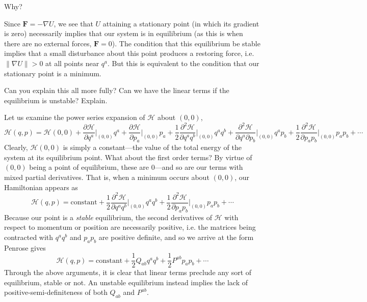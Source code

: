 \documentclass[../road-to-reality.tex]{subfiles}
\begin{document}
\begin{questions}
\question Why?

  \begin{solution}
    Since $\mathbf{F}=-\nabla{U}$, we see that $U$ attaining a stationary point (in which its
    gradient is zero) necessarily implies that our system is in 
    equilibrium (as this is when there are no external forces, $\mathbf{F} =
    0$). The condition that this equilibrium be stable implies that a small disturbance about this point produces a restoring force, i.e. $\|\nabla{U}\|
    > 0$ at all points near $q^a$. But this is equivalent to the condition that our stationary point is a minimum.
  \end{solution}

\question Can you explain this all more fully? Can we have the linear terms if
  the equilibrium is unstable? Explain.

  \begin{solution}
    Let us examine the power series expansion of $\mathcal{H}$ about $(0, 0)$,
    \[
      \mathcal{H}(q, p) = \mathcal{H}(0, 0) + \frac{\partial\mathcal{H}}{\partial{q^a}}\Big|_{(0,0)}q^a +
      \frac{\partial\mathcal{H}}{\partial{p_a}}\Big|_{(0,0)}p_a + \frac{1}{2}\frac{\partial^2\mathcal{H}}{\partial{q^aq^b}}\Big|_{(0,0)}q^aq^b +
      \frac{\partial^2\mathcal{H}}{\partial{q^a}\partial{p_b}}\Big|_{(0,0)}q^ap_b +
      \frac{1}{2}\frac{\partial^2\mathcal{H}}{\partial{p_ap_b}}\Big|_{(0,0)}p_ap_b + \cdots
    \]
    Clearly, $\mathcal{H}(0,0)$ is simply a constant---the value of the total
    energy of the system at its equilibrium point. What about the first order
    terms? By virtue of $(0,0)$ being a point of equilibrium, these are
    $0$---and so are our terms with mixed partial derivatives. That is, when a
    minimum occurs about $(0,0)$, our Hamiltonian appears as
    \[
      \mathcal{H}(q, p) = \text{constant} +
      \frac{1}{2}\frac{\partial^2\mathcal{H}}{\partial{q^aq^b}}\Big|_{(0,0)}q^aq^b +
      \frac{1}{2}\frac{\partial^2\mathcal{H}}{\partial{p_ap_b}}\Big|_{(0,0)}p_ap_b
      + \cdots
    \]
    Because our point is a \textit{stable} equilibrium, the second derivatives
    of $\mathcal{H}$ with respect to momentum or position are necessarily
    positive, i.e. the matrices being contracted with $q^aq^b$ and $p_ap_b$ are
    positive definite, and so we arrive at the form Penrose gives
    \[
      \mathcal{H}(q,p) = \text{constant} + \frac{1}{2}Q_{ab}q^aq^b +
      \frac{1}{2}P^{ab}p_ap_b + \cdots
    \]
    Through the above arguments, it is clear that linear terms preclude any sort
    of equilibrium, stable or not. An unstable equilibrium instead implies the
    lack of positive-semi-definiteness of both $Q_{ab}$ and $P^{ab}$.
  \end{solution}


\end{questions}
\end{document}

